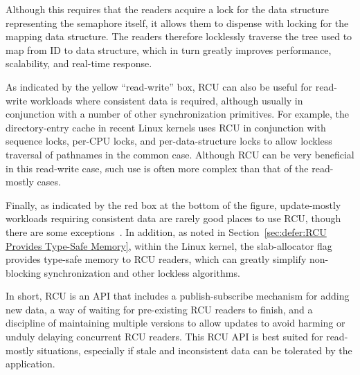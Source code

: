 Although this requires that the readers acquire a lock for the
data structure representing the semaphore itself,
it allows them to dispense with locking for the
mapping data structure.
The readers therefore locklessly
traverse the tree used to map from ID to data structure,
which in turn greatly improves performance, scalability, and
real-time response.

As indicated by the yellow ``read-write'' box, RCU can also be useful
for read-write
workloads where consistent data is required, although usually in
conjunction with a number of other synchronization primitives.
For example, the directory-entry cache in recent Linux kernels uses RCU in
conjunction with sequence locks, per-CPU locks, and per-data-structure
locks to allow lockless traversal of pathnames in the common case.
Although RCU can be very beneficial in this read-write case, such
use is often more complex than that of the read-mostly cases.

Finally, as indicated by the red box at the bottom of the figure,
update-mostly workloads requiring
consistent data are rarely good places to use RCU, though there are some
exceptions~\cite{MathieuDesnoyers2012URCU}.
In addition, as noted in
Section~\ref{sec:defer:RCU Provides Type-Safe Memory},
within the Linux kernel, the 
slab-allocator flag provides type-safe memory to RCU readers, which can
greatly simplify non-blocking synchronization and other lockless
algorithms.

In short, RCU is an API that includes a publish-subscribe mechanism for
adding new data, a way of waiting for pre-existing RCU readers to finish,
and a discipline of maintaining multiple versions to allow updates to
avoid harming or unduly delaying concurrent RCU readers.
This RCU API is best suited for read-mostly situations, especially if
stale and inconsistent data can be tolerated by the application.
